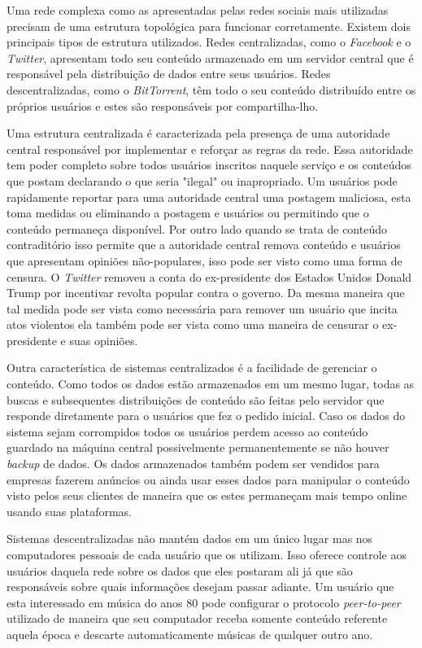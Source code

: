 \documentclass[12pt]{article}
\newcommand{\PtoP} {\textit{peer-to-peer}\xspace}
\begin{document}
Uma rede complexa como as apresentadas pelas redes sociais mais utilizadas precisam de uma estrutura topológica para funcionar corretamente.  
Existem dois principais tipos de estrutura utilizados.  
Redes centralizadas, como o \textit{Facebook} e o \textit{Twitter}, apresentam todo seu conteúdo armazenado em um servidor central que é responsável pela distribuição de dados entre seus usuários.
Redes descentralizadas, como o \textit{BitTorrent}, têm todo o seu conteúdo distribuído entre os próprios usuários e estes são responsáveis por compartilha-lho.

Uma estrutura centralizada é caracterizada pela presença de uma autoridade central responsável por implementar e reforçar as regras da rede. 
Essa autoridade tem poder completo sobre todos usuários inscritos naquele serviço e os conteúdos que postam declarando o que seria "ilegal" ou inapropriado. 
Um usuários pode rapidamente reportar para uma autoridade central uma postagem maliciosa, esta toma medidas ou eliminando a postagem e usuários ou permitindo que o conteúdo permaneça disponível.
Por outro lado quando se trata de conteúdo contraditório isso permite que a autoridade central remova conteúdo e usuários que apresentam opiniões não-populares, isso pode ser visto como uma forma de censura. 
O \textit{Twitter} removeu a conta do ex-presidente dos Estados Unidos Donald Trump por incentivar revolta popular contra o governo. 
Da mesma maneira que tal medida pode ser vista como necessária para remover um usuário que incita atos violentos ela também pode ser vista como uma maneira de censurar o ex-presidente e suas opiniões.

Outra característica de sistemas centralizados é a facilidade de gerenciar o conteúdo. 
Como todos os dados estão armazenados em um mesmo lugar, todas as buscas e subsequentes distribuições de conteúdo são feitas pelo servidor que responde diretamente para o usuários que fez o pedido inicial.
Caso os dados do sistema sejam corrompidos todos os usuários perdem acesso ao conteúdo guardado na máquina central possivelmente permanentemente se não houver \textit{backup} de dados.
Os dados armazenados também podem ser vendidos para  empresas fazerem anúncios ou ainda usar esses dados para manipular o conteúdo visto pelos seus clientes de maneira que os estes permaneçam mais tempo online usando suas plataformas. 

Sistemas descentralizadas não mantém dados em um único lugar mas nos computadores pessoais de cada usuário que os utilizam.
Isso oferece controle aos usuários daquela rede sobre os dados que eles postaram ali já que são responsáveis sobre quais informações desejam passar adiante.
Um usuário que esta interessado em música do anos 80 pode configurar o protocolo \PtoP utilizado de maneira que seu computador receba somente conteúdo referente aquela época e descarte automaticamente músicas de qualquer outro ano.
\end{document}
